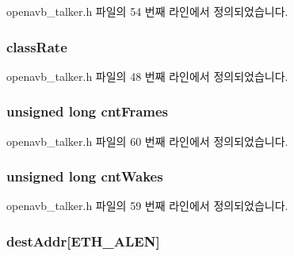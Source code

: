 openavb\+\_\+talker.\+h 파일의 54 번째 라인에서 정의되었습니다.

\subsubsection[{\texorpdfstring{class\+Rate}{classRate}}]{ class\+Rate}\hypertarget{structtalker__data__t_a0bf28249cb23ce65c155693440118df5}{}\label{structtalker__data__t_a0bf28249cb23ce65c155693440118df5}


openavb\+\_\+talker.\+h 파일의 48 번째 라인에서 정의되었습니다.

\subsubsection[{\texorpdfstring{cnt\+Frames}{cntFrames}}]{\setlength{\rightskip}{0pt plus 5cm}unsigned long cnt\+Frames}\hypertarget{structtalker__data__t_aba2cd205107b713b2d945cbb84442316}{}\label{structtalker__data__t_aba2cd205107b713b2d945cbb84442316}


openavb\+\_\+talker.\+h 파일의 60 번째 라인에서 정의되었습니다.

\subsubsection[{\texorpdfstring{cnt\+Wakes}{cntWakes}}]{\setlength{\rightskip}{0pt plus 5cm}unsigned long cnt\+Wakes}\hypertarget{structtalker__data__t_aac58e4369721569b14577c867c852feb}{}\label{structtalker__data__t_aac58e4369721569b14577c867c852feb}


openavb\+\_\+talker.\+h 파일의 59 번째 라인에서 정의되었습니다.

\subsubsection[{\texorpdfstring{dest\+Addr}{destAddr}}]{ dest\+Addr\mbox{[}{\bf E\+T\+H\+\_\+\+A\+L\+EN}\mbox{]}}\hypertarget{structtalker__data__t_a016f2167ae2143dcacd762c10be2f614}{}\label{structtalker__data__t_a016f2167ae2143dcacd762c10be2f614}


